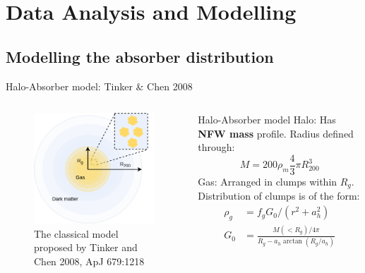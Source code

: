 \documentclass{beamer}
\begin{document}
\section{Data Analysis and Modelling}
	\subsection{Modelling the absorber distribution}
		\begin{frame}{Halo-Absorber model: Tinker \& Chen 2008}
			\begin{columns}
				\begin{column}{0.5\textwidth}
					\begin{figure}
						\includegraphics[width=\textwidth]{halo-model.png}
						\caption{\tiny The classical model proposed by Tinker and Chen 2008, ApJ 679:1218}
					\end{figure}
				\end{column}
				\begin{column}{0.5\textwidth}
					\begin{block}{Halo-Absorber model}
						Halo: Has \textbf{NFW mass} profile. Radius defined through:
						$$
							M=200\rho_m\frac{4}{3}\pi R_{200}^3
						$$
						Gas: Arranged in clumps within $R_g$. Distribution of clumps is of the form:
						$$
						\begin{aligned}
							\rho_g &= f_gG_0/(r^2+a_h^2)\\
							G_0 &= \frac{M(<R_g)/4\pi}{R_g-a_h\arctan(R_g/a_h)}\\
						\end{aligned}
						$$
					\end{block}
				\end{column}
			\end{columns}
		\end{frame}
\end{document}
